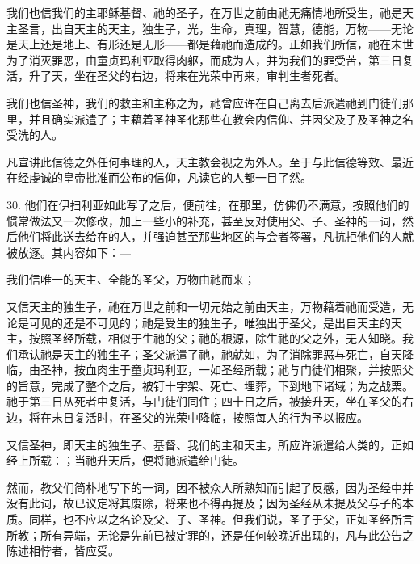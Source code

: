我们也信我们的主耶稣基督、祂的圣子，在万世之前由祂无痛情地所受生，祂是天主圣言，出自天主的天主，独生子，光，生命，真理，智慧，德能，万物——无论是天上还是地上、有形还是无形——都是藉祂而造成的。正如我们所信，祂在末世为了消灭罪恶，由童贞玛利亚取得肉躯，而成为人，并为我们的罪受苦，第三日复活，升了天，坐在圣父的右边，将来在光荣中再来，审判生者死者。\par

我们也信圣神，我们的救主和主称之为，祂曾应许在自己离去后派遣祂到门徒们那里，并且确实派遣了；主藉着圣神圣化那些在教会内信仰、并因父及子及圣神之名受洗的人。\par

凡宣讲此信德之外任何事理的人，天主教会视之为外人。至于与此信德等效、最近在经虔诚的皇帝批准而公布的信仰，凡读它的人都一目了然。\par

30. 他们在伊扫利亚如此写了之后，便前往，在那里，仿佛仍不满意，按照他们的惯常做法又一次修改，加上一些小的补充，甚至反对使用父、子、圣神的一词，然后他们将此送去给在的人，并强迫甚至那些地区的与会者签署，凡抗拒他们的人就被放逐。其内容如下：—\par

我们信唯一的天主、全能的圣父，万物由祂而来；\par

又信天主的独生子，祂在万世之前和一切元始之前由天主，万物藉着祂而受造，无论是可见的还是不可见的；祂是受生的独生子，唯独出于圣父，是出自天主的天主，按照圣经所载，相似于生祂的父；祂的根源，除生祂的父之外，无人知晓。我们承认祂是天主的独生子；圣父派遣了祂，祂就如，为了消除罪恶与死亡，自天降临，由圣神，按血肉生于童贞玛利亚，一如圣经所载；祂与门徒们相聚，并按照父的旨意，完成了整个之后，被钉十字架、死亡、埋葬，下到地下诸域；为之战栗。祂于第三日从死者中复活，与门徒们同住；四十日之后，被接升天，坐在圣父的右边，将在末日复活时，在圣父的光荣中降临，按照每人的行为予以报应。\par

又信圣神，即天主的独生子、基督、我们的主和天主，所应许派遣给人类的，正如经上所载：；当祂升天后，便将祂派遣给门徒。\par

然而，教父们简朴地写下的一词，因不被众人所熟知而引起了反感，因为圣经中并没有此词，故已议定将其废除，将来也不得再提及；因为圣经从未提及父与子的本质。同样，也不应以之名论及父、子、圣神。但我们说，圣子于父，正如圣经所言所教；所有异端，无论是先前已被定罪的，还是任何较晚近出现的，凡与此公告之陈述相悖者，皆应受。\par

